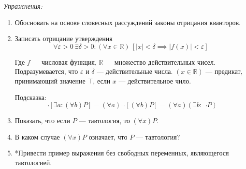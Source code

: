 {\it Упражнения:}
\begin{enumerate}
	\item{}Обосновать на основе словесных рассуждений законы отрицания
	кванторов\label{ex:quantor_neg_def}.
	\item{}Записать отрицание утверждения
	\[
		\forall \varepsilon>0~\exists \delta>0:
		(\forall x\in\mathbb{R})~[|x|<\delta\implies |f(x)|<\varepsilon]
	\]

	Где $f$ --- числовая функция, $\mathbb{R}$ --- множество действительных чисел.
	Подразумевается, что $\varepsilon$ и $\delta$ --- действительные числа.
	${(x\in\mathbb{R})}$ --- предикат, принимающий значение $\top$,
	если $x$ --- действительное чило.

	Подсказка:
	\[
		\lnot[\exists a:(\forall b)P]=(\forall a)\lnot[(\forall b)P]=
		(\forall a)(\exists b:\lnot P)
	\]

	\item{}Показать, что если $P$ --- тавтология, то $(\forall x)P$.

	\item{}В каком случае $(\forall x)P$ означает, что $P$ --- тавтология?

	\item{}*Привести пример выражения без свободных переменных,
	являющегося тавтологией.
\end{enumerate}
